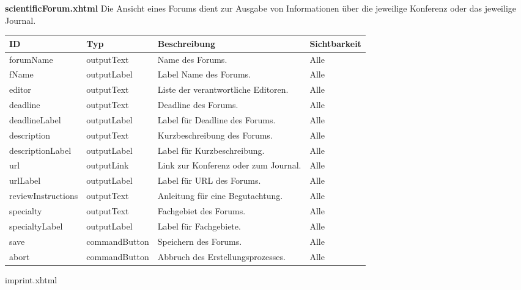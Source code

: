 \textbf{scientificForum.xhtml} Die Ansicht eines Forums dient zur Ausgabe von Informationen über die jeweilige Konferenz oder das jeweilige Journal.

\begin{tabular}[H]{|m{2cm}|m{3cm}|m{6cm}|m{2.5cm}|}
    \hline
    \textbf{ID} & \textbf{Typ} & \textbf{Beschreibung} & \textbf{Sichtbarkeit} \\
    \hline
    \hline
    forumName & outputText & Name des Forums. & Alle\\
    \hline
    fName & outputLabel & Label Name des Forums. & Alle\\
    \hline
    editor & outputText & Liste der verantwortliche Editoren. & Alle\\
    \hline
    deadline & outputText & Deadline des Forums. & Alle\\
    \hline
    deadlineLabel & outputLabel & Label für Deadline des Forums. & Alle\\
    \hline
    description & outputText & Kurzbeschreibung des Forums. & Alle\\
    \hline
    descriptionLabel & outputLabel & Label für Kurzbeschreibung. & Alle\\
    \hline
    url & outputLink & Link zur Konferenz oder zum Journal. & Alle\\
    \hline
    urlLabel & outputLabel & Label für URL des Forums. & Alle\\
    \hline
    reviewInstructions  & outputText & Anleitung für eine Begutachtung. & Alle\\
    \hline
    specialty & outputText & Fachgebiet des Forums. & Alle\\
    \hline
    specialtyLabel & outputLabel & Label für Fachgebiete. & Alle\\
    \hline
    save & commandButton & Speichern des Forums. & Alle\\
    \hline
    abort & commandButton & Abbruch des Erstellungsprozesses. & Alle\\
    \hline
\end{tabular}

imprint.xhtml

